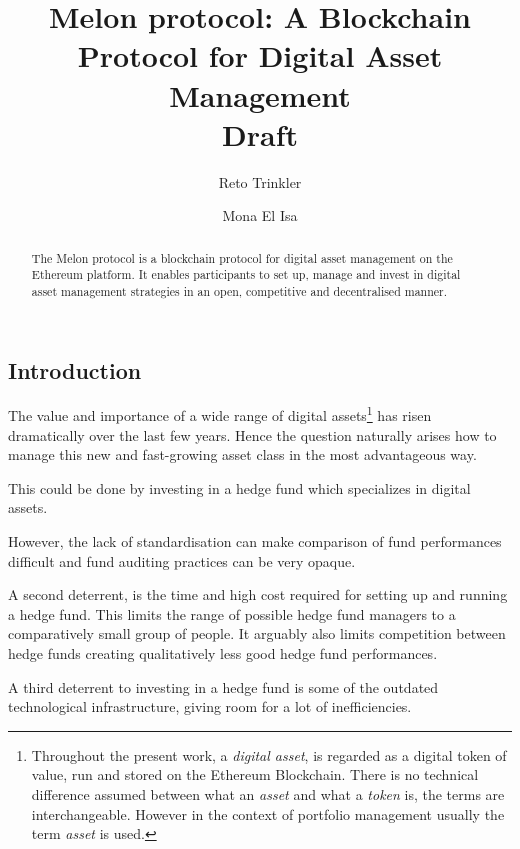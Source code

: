 \documentclass[9pt,oneside]{amsart}
\title{Melon protocol: A Blockchain Protocol for Digital Asset Management \\ {\smaller \textbf{Draft}}}
\author{Reto Trinkler}
\author{Mona El Isa}
\theoremstyle{plain}
\begin{document}
	
\pagecolor{lightgreen}
	
\begin{abstract}
	
The Melon protocol is a blockchain protocol for digital asset management on the Ethereum platform. It enables participants to set up, manage and invest in digital asset management strategies in an open, competitive and decentralised manner.

\end{abstract}

\maketitle

\setlength{\columnsep}{20pt}

\begin{multicols}{2}
	
\section{Introduction}\label{sec:introduction}

The value and importance of a wide range of digital assets\footnote{Throughout the present work, a \textit{digital asset}, is regarded as a digital token of value, run and stored on the Ethereum Blockchain. There is no technical difference assumed between what an \textit{asset} and what a \textit{token} is, the terms are interchangeable. However in the context of portfolio management usually the term \textit{asset} is used.} has risen dramatically over the last few years. Hence the question naturally arises how to manage this new and fast-growing asset class in the most advantageous way.

This could be done by investing in a hedge fund which specializes in digital assets. 

However, the lack of standardisation can make comparison of fund performances difficult and fund auditing practices can be very opaque.

A second deterrent, is the time and high cost required for setting up and running a hedge fund. This limits the range of possible hedge fund managers to a comparatively small group of people. It arguably also limits competition between hedge funds creating qualitatively less good hedge fund performances\cite{mitstudy}. 

A third deterrent to investing in a hedge fund is some of the outdated technological infrastructure, giving room for a lot of inefficiencies.


\end{multicols}
\end{document}
